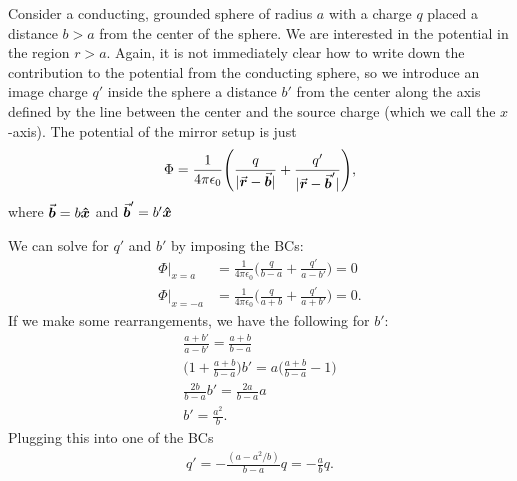 Consider a conducting, grounded sphere of radius $a$ with a charge $q$ placed a distance $b > a$ from the center of the sphere.
We are interested in the potential in the region $r > a$.
Again, it is not immediately clear how to write down the contribution to the potential from the conducting sphere, so we introduce an image charge $q'$ inside the sphere a distance $b'$ from the center along the axis defined by the line between the center and the source charge (which we call the $x$-axis).
The potential of the mirror setup is just
\begin{eqnarray}
    \Phi = \frac{1}{4 \pi \epsilon_0} \Bigg( \frac{q}{|\va*{r} - \va*{b}|} + \frac{q'}{|\va*{r} - \va*{b}'|} \Bigg)
,\end{eqnarray}
where $\va*{b} = b \vu*{x}$ and $\va*{b}' = b' \vu*{x}$

We can solve for $q'$ and $b'$ by imposing the BCs:
\begin{align}
    \Phi|_{x = a} &= \frac{1}{4 \pi \epsilon_0} \Big( \frac{q}{b - a} + \frac{q'}{a - b'} \Big) = 0 \\
    \Phi|_{x = -a} &= \frac{1}{4 \pi \epsilon_0} \Big( \frac{q}{a + b} + \frac{q'}{a + b'} \Big) = 0
.\end{align}
If we make some rearrangements, we have the following for $b'$:
\begin{gather}
    \frac{a + b'}{a - b'} = \frac{a + b}{b - a} \nonumber \\
    \Big( 1 + \frac{a + b}{b - a} \Big) b' = a \Big( \frac{a + b}{b - a} - 1 \Big) \nonumber \\
    \frac{2b}{b - a} b' = \frac{2a}{b - a} a \nonumber \\
    b' = \frac{a^2}{b}
.\end{gather}
Plugging this into one of the BCs
\begin{eqnarray}
    q' = -\frac{(a - a^2/b)}{b-a} q = -\frac{a}{b} q
.\end{eqnarray}











